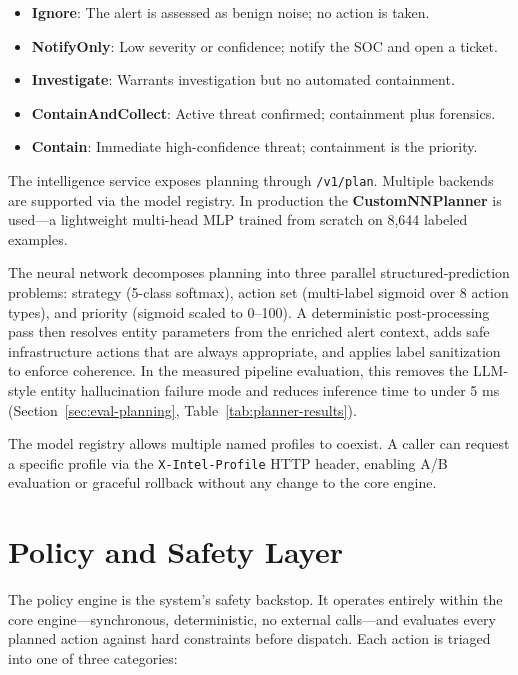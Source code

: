 \begin{itemize}
  \item \textbf{Ignore}: The alert is assessed as benign noise; no action is taken.
  \item \textbf{NotifyOnly}: Low severity or confidence; notify the SOC and open a ticket.
  \item \textbf{Investigate}: Warrants investigation but no automated containment.
  \item \textbf{ContainAndCollect}: Active threat confirmed; containment plus forensics.
  \item \textbf{Contain}: Immediate high-confidence threat; containment is the priority.
\end{itemize}

The intelligence service exposes planning through \texttt{/v1/plan}. Multiple backends
are supported via the model registry. In production the \textbf{CustomNNPlanner} is
used---a lightweight multi-head MLP trained from scratch on 8,644 labeled examples.

The neural network decomposes planning into three parallel structured-prediction
problems: strategy (5-class softmax), action set (multi-label sigmoid over 8 action
types), and priority (sigmoid scaled to 0--100). A deterministic post-processing pass
then resolves entity parameters from the enriched alert context, adds safe infrastructure
actions that are always appropriate, and applies label sanitization to enforce coherence.
In the measured pipeline evaluation, this removes the LLM-style entity hallucination
failure mode and reduces inference time to under 5 ms (Section~\ref{sec:eval-planning},
Table~\ref{tab:planner-results}).

The model registry allows multiple named profiles to coexist. A caller can request a
specific profile via the \texttt{X-Intel-Profile} HTTP header, enabling A/B evaluation
or graceful rollback without any change to the core engine.

\section{Policy and Safety Layer}

The policy engine is the system's safety backstop. It operates entirely within the core
engine---synchronous, deterministic, no external calls---and evaluates every planned
action against hard constraints before dispatch. Each action is triaged into one of three
categories:

